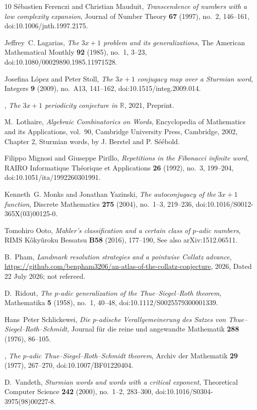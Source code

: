 \documentclass[11pt,reqno]{amsart}
\theoremstyle{plain}
\theoremstyle{definition}
\begin{document}
\begin{thebibliography}{10}
S\'ebastien Ferenczi and Christian Mauduit, \emph{Transcendence of numbers with
  a low complexity expansion}, Journal of Number Theory \textbf{67} (1997),
  no.~2, 146--161, doi:10.1006/jnth.1997.2175.

Jeffrey~C. Lagarias, \emph{The $3x+1$ problem and its generalizations}, The
  American Mathematical Monthly \textbf{92} (1985), no.~1, 3--23,
  doi:10.1080/00029890.1985.11971528.

Josefina L\'opez and Peter Stoll, \emph{The $3x+1$ conjugacy map over a
  {S}turmian word}, Integers \textbf{9} (2009), no.~A13, 141--162,
  doi:10.1515/integ.2009.014.

\bysame, \emph{The $3x+1$ periodicity conjecture in $\mathbb{R}$}, 2021,
  Preprint.

M.~Lothaire, \emph{Algebraic {C}ombinatorics on {W}ords}, Encyclopedia of
  Mathematics and its Applications, vol.~90, Cambridge University Press,
  Cambridge, 2002, Chapter 2, Sturmian words, by J. Berstel and P. S\'e\'ebold.

Filippo Mignosi and Giuseppe Pirillo, \emph{Repetitions in the {F}ibonacci
  infinite word}, RAIRO Informatique Th\'eorique et Applications \textbf{26}
  (1992), no.~3, 199--204, doi:10.1051/ita/1992260301991.

Kenneth~G. Monks and Jonathan Yazinski, \emph{The autoconjugacy of the $3x+1$
  function}, Discrete Mathematics \textbf{275} (2004), no.~1--3, 219--236,
  doi:10.1016/S0012-365X(03)00125-0.

Tomohiro Ooto, \emph{{M}ahler's classification and a certain class of $p$-adic
  numbers}, RIMS K\^oky\^uroku Bessatsu \textbf{B58} (2016), 177--190, See also
  arXiv:1512.06511.

B.~Pham, \emph{Landmark resolution strategies and a pointwise {C}ollatz
  advance},
  \url{https://github.com/benpham3206/an-atlas-of-the-collatz-conjecture},
  2026, Dated 22 July 2026; not refereed.

D.~Ridout, \emph{The $p$-adic generalization of the {T}hue--{S}iegel--{R}oth
  theorem}, Mathematika \textbf{5} (1958), no.~1, 40--48,
  doi:10.1112/S0025579300001339.

Hans~Peter Schlickewei, \emph{Die $p$-adische {V}erallgemeinerung des {S}atzes
  von {T}hue--{S}iegel--{R}oth--{S}chmidt}, Journal f\"ur die reine und
  angewandte Mathematik \textbf{288} (1976), 86--105.

\bysame, \emph{The $p$-adic {T}hue--{S}iegel--{R}oth--{S}chmidt theorem},
  Archiv der Mathematik \textbf{29} (1977), 267--270, doi:10.1007/BF01220404.

D.~Vandeth, \emph{{S}turmian words and words with a critical exponent},
  Theoretical Computer Science \textbf{242} (2000), no.~1--2, 283--300,
  doi:10.1016/S0304-3975(98)00227-8.

\end{thebibliography}
\end{document}
